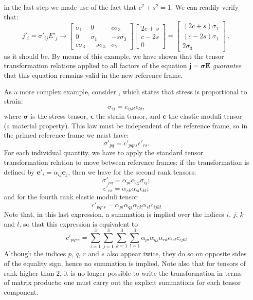 in the last step we made use of the fact that $c^2+s^2=1$.  We can readily verify that:
\[
	j'_i = \sigma'_{ij}E'_j\rightarrow \begin{bmatrix}\sigma_1 & 0 & c\sigma_3\\
0 & \sigma_1 & -s\sigma_3\\
c\sigma_3 & -s\sigma_3 & \sigma_2\end{bmatrix}\begin{bmatrix} 2c+s\\ c-2s\\ 0\end{bmatrix} = \begin{bmatrix} (2c+s)\sigma_1\\ (c-2s)\sigma_1\\ 2\sigma_3\end{bmatrix}\ ,
\]
as it should be.  By means of this example, we have shown that the tensor transformation relations applied to all factors of the equation $\mathbf{j}=\bm{\sigma}\mathbf{E}$  \textit{guarantee} that this equation remains valid in the new reference frame.  

As a more complex example, consider , which states that stress is proportional to strain:
\[
	\sigma_{ij}=c_{ijkl}\epsilon_{kl},
\]
where $\bm{\sigma}$ is the stress tensor, $\bm{\epsilon}$ the strain tensor, and $\mathbf{c}$ the elastic moduli tensor (a material property).  This law must be independent of the reference frame, so in the primed reference frame we must have:
\[
	\sigma'_{pq}=c'_{pqrs}\epsilon'_{rs}.
\]
For each individual quantity, we have to apply the standard tensor transformation relation to move between reference frames; if the transformation is defined by $\mathbf{e}'_i = \alpha_{ij}\mathbf{e}_j$, then we have for the second rank tensors:
\[
	\sigma'_{pq} = \alpha_{pi}\alpha_{qj}\sigma_{ij};
\] 
\[
	\epsilon'_{rs} = \alpha_{rk}\alpha_{sl}\epsilon_{kl};
\] 
and for the fourth rank elastic moduli tensor
\[
	c'_{pqrs} = \alpha_{pi}\alpha_{qj}\alpha_{rk}\alpha_{sl} c_{ijkl}
\]
Note that, in this last expression, a summation is implied over the indices $i$, $j$, $k$ and $l$, so that this 
expression is equivalent to
\[
	c'_{pqrs}=\sum_{i=1}^{3}\sum_{j=1}^{3}\sum_{k=1}^{3}\sum_{l=1}^{3}\alpha_{pi}\alpha_{qj}\alpha_{rk}\alpha_{sl} c_{ijkl}
\]
Although the indices $p$, $q$, $r$ and $s$ also appear twice, they do so on opposite sides of the equality sign, hence no summation is implied.  Note also that for tensors of rank higher than $2$, it is no longer possible to write the transformation in terms of matrix products; one must carry out the explicit summations for each tensor component.


